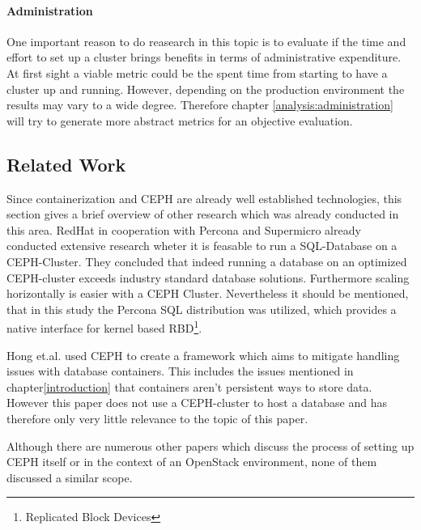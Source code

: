 \documentclass[titlepage, a4paper, 11pt]{scrartcl}
\begin{document}
            \paragraph{Administration}

                One important reason to do reasearch in this topic is to evaluate if the time and effort to
                set up a cluster brings benefits in terms of administrative expenditure. At first sight a viable
                metric could be the spent time from starting to have a cluster up and running. However, depending
                on the production environment the results may vary to a wide degree. Therefore chapter \ref*{analysis:administration}
                will try to generate more abstract metrics for an objective evaluation.


        \subsection{Related Work}
        
            Since containerization and CEPH are already well established technologies, this section gives a brief overview of 
            other research which was already conducted in this area.
            RedHat in cooperation with Percona and Supermicro already conducted extensive research wheter it is feasable to
            run a SQL-Database on a CEPH-Cluster\cite{redhatstudy}. They concluded that indeed running a database on an 
            optimized CEPH-cluster exceeds industry standard database solutions. Furthermore scaling horizontally 
            is easier with a CEPH Cluster. Nevertheless it should be mentioned, that in this study the Percona 
            SQL distribution was utilized, which provides a native interface for kernel based RBD\footnote{Replicated Block Devices}.
            
            Hong et.al. used CEPH to create a framework which aims to mitigate handling issues with database containers.
            This includes the issues mentioned in chapter\ref*{introduction} that containers aren't persistent ways
            to store data\cite{hong2019database}. However this paper does not use a CEPH-cluster to host a database and
            has therefore only very little relevance to the topic of this paper. 
            
            Although there are numerous other papers
            which discuss the process of setting up CEPH itself or in the context of an OpenStack environment,
            none of them discussed a similar scope.            
\end{document}
